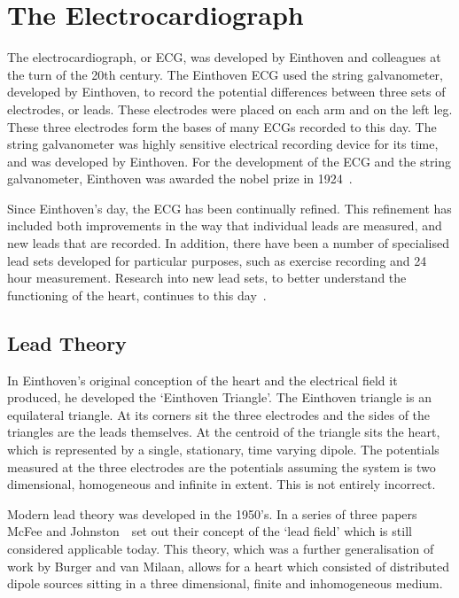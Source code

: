 \section{The Electrocardiograph}

The electrocardiograph, or ECG, was developed by Einthoven and colleagues at the
turn of the 20th century.
The Einthoven ECG used the string galvanometer, developed by Einthoven, to
record the potential differences between three sets of electrodes, or leads.
These electrodes were placed on each arm and on the left leg.
These three electrodes form the bases of many ECGs recorded to this day.
The string galvanometer was highly sensitive electrical recording device for its
time, and was developed by Einthoven.
For the development of the ECG and the string galvanometer, Einthoven was awarded
the nobel prize in 1924~\cite{Kligfield2002,Levick1991}.

Since Einthoven's day, the ECG has been continually refined.
This refinement has included both improvements in the way that individual leads
are measured, and new leads that are recorded.
In addition, there have been a number of specialised lead sets developed for
particular purposes, such as exercise recording and 24 hour measurement.
Research into new lead sets, to better understand the functioning of the heart,
continues to this
day~\cite{Jahrsdoerfer2005,Sobieszczanska2007,Grube2007,Finlay2007}.

\subsection{Lead Theory}
\label{sec:intro:ecg:lead_theory}

In Einthoven's original conception of the heart and the electrical field it
produced, he developed the `Einthoven Triangle'.
The Einthoven triangle is an equilateral triangle.
At its corners sit the three electrodes and the sides of the triangles are the
leads themselves.
At the centroid of the triangle sits the heart, which is represented by a
single, stationary, time varying dipole.
The potentials measured at the three electrodes are the potentials assuming the
system is two dimensional, homogeneous and infinite in extent.
This is not entirely incorrect.

Modern lead theory was developed in the 1950's.
In a series of three papers McFee and
Johnston~\cite{McFee1953,McFee1954a,McFee1954b}\ set out their concept of the
`lead field' which is still considered applicable today.
This theory, which was a further generalisation of work by Burger and van
Milaan, allows for a heart which consisted of distributed dipole sources
sitting in a three dimensional, finite and inhomogeneous medium.

